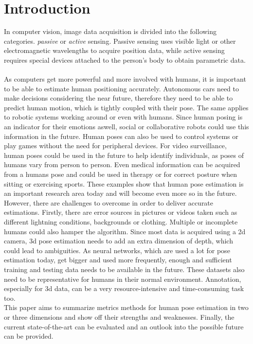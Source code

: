 \section{Introduction}
In computer vision, image data acquisition is divided into the following categories. \emph{passive} or \emph{active} sensing. Passive sensing uses visible light or other electromagnetic wavelengths to acquire position data, while active sensing requires special devices attached to the person's body to obtain parametric data. 
\\\\
As computers get more powerful and more involved with humans, it is important to be able to estimate human positioning accurately. Autonomous cars need to make decisions considering the near future, therefore they need to be able to predict human motion, which is tightly coupled with their pose. The same applies to robotic systems working around or even with humans. Since human posing is an indicator for their emotions aswell, social or collaborative robots could use this information in the future. Human poses can also be used to control systems or play games without the need for peripheral devices. For video surveillance, human poses could be used in the future to help identify individuals, as poses of humans vary from person to person. Even medical information can be acquired from a humans pose and could be used in therapy or for correct posture when sitting or exercising sports. These examples show that human pose estimation is an important research area today and will become even more so in the future. \\
However, there are challenges to overcome in order to deliver accurate estimations. Firstly, there are error sources in pictures or videos taken such as different lightning conditions, backgrounds or clothing. Multiple or incomplete humans could also hamper the algorithm. Since most data is acquired using a 2d camera, 3d pose estimation needs to add an extra dimension of depth, which could lead to ambiguities. As neural networks, which are used a lot for pose estimation today, get bigger and used more frequently, enough and sufficient training and testing data needs to be available in the future. These datasets also need to be representative for humans in their normal environment. Annotation, especially for 3d data, can be a very resource-intensive and time-consuming task too.
\\
This paper aims to summarize metrics methods for human pose estimation in two or three dimensions and show off their strengths and weaknesses. Finally, the current state-of-the-art can be evaluated and an outlook into the possible future can be provided.
